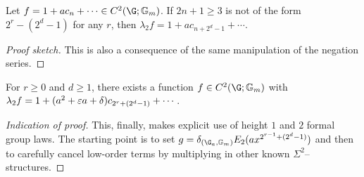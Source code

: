 \begin{lemma}\label{SigmaArrowLemma}
Let \(f = 1 + a c_n + \cdots \in C^2(\G; \Gm)\).  If \(2n+1 \ge 3\) is not of the form \(2^r - (2^d - 1)\) for any \(r\), then \(\lambda_2 f = 1 + a c_{n + 2^d - 1} + \cdots\).
\end{lemma}
\begin{proof}[Proof sketch]
This is also a consequence of the same manipulation of the negation series.
\end{proof}

\begin{lemma}\label{SigmaSpecialCaseLemma}
For \(r \ge 0\) and \(d \ge 1\), there exists a function \(f \in C^2(\G; \Gm)\) with \(\lambda_2 f = 1 + (a^2 + \varepsilon a + \delta) c_{2^r + (2^d - 1)} + \cdots\).
\end{lemma}
\begin{proof}[Indication of proof]
This, finally, makes explicit use of height \(1\) and \(2\) formal group laws.  The starting point is to set \(g = \delta_{(\G_a, \Gm)}E_2(ax^{2^{r-1} + (2^d-1)})\) and then to carefully cancel low-order terms by multiplying in other known \(\Sigma^2\)--structures.
\end{proof}

